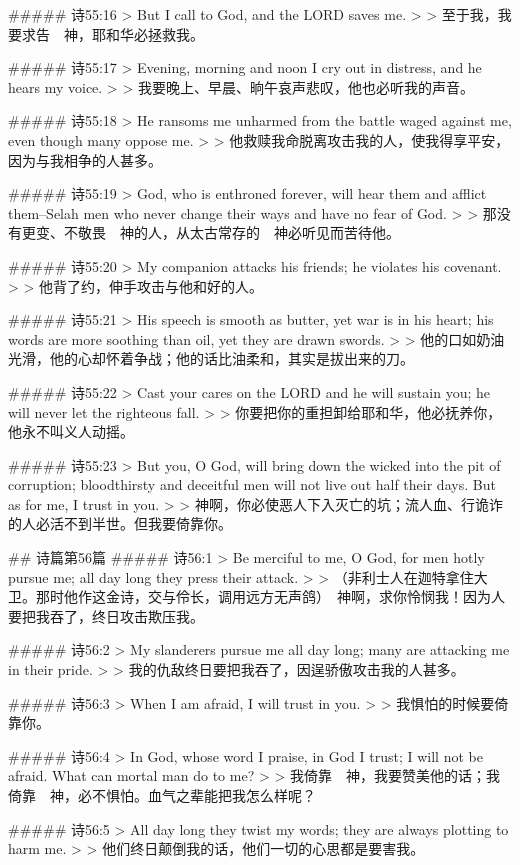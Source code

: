 ##### 诗55:16
> But I call to God, and the LORD saves me.
>
> 至于我，我要求告　神，耶和华必拯救我。


##### 诗55:17
> Evening, morning and noon I cry out in distress, and he hears my voice.
>
> 我要晚上、早晨、晌午哀声悲叹，他也必听我的声音。


##### 诗55:18
> He ransoms me unharmed from the battle waged against me, even though many oppose me.
>
> 他救赎我命脱离攻击我的人，使我得享平安，因为与我相争的人甚多。


##### 诗55:19
> God, who is enthroned forever, will hear them and afflict them--Selah men who never change their ways and have no fear of God.
>
> 那没有更变、不敬畏　神的人，从太古常存的　神必听见而苦待他。


##### 诗55:20
> My companion attacks his friends; he violates his covenant.
>
> 他背了约，伸手攻击与他和好的人。


##### 诗55:21
> His speech is smooth as butter, yet war is in his heart; his words are more soothing than oil, yet they are drawn swords.
>
> 他的口如奶油光滑，他的心却怀着争战；他的话比油柔和，其实是拔出来的刀。


##### 诗55:22
> Cast your cares on the LORD and he will sustain you; he will never let the righteous fall.
>
> 你要把你的重担卸给耶和华，他必抚养你，他永不叫义人动摇。


##### 诗55:23
> But you, O God, will bring down the wicked into the pit of corruption; bloodthirsty and deceitful men will not live out half their days. But as for me, I trust in you.
>
> 神啊，你必使恶人下入灭亡的坑；流人血、行诡诈的人必活不到半世。但我要倚靠你。


## 诗篇第56篇
##### 诗56:1
> Be merciful to me, O God, for men hotly pursue me; all day long they press their attack.
>
> （非利士人在迦特拿住大卫。那时他作这金诗，交与伶长，调用远方无声鸽）　神啊，求你怜悯我！因为人要把我吞了，终日攻击欺压我。


##### 诗56:2
> My slanderers pursue me all day long; many are attacking me in their pride.
>
> 我的仇敌终日要把我吞了，因逞骄傲攻击我的人甚多。


##### 诗56:3
> When I am afraid, I will trust in you.
>
> 我惧怕的时候要倚靠你。


##### 诗56:4
> In God, whose word I praise, in God I trust; I will not be afraid. What can mortal man do to me?
>
> 我倚靠　神，我要赞美他的话；我倚靠　神，必不惧怕。血气之辈能把我怎么样呢？


##### 诗56:5
> All day long they twist my words; they are always plotting to harm me.
>
> 他们终日颠倒我的话，他们一切的心思都是要害我。



